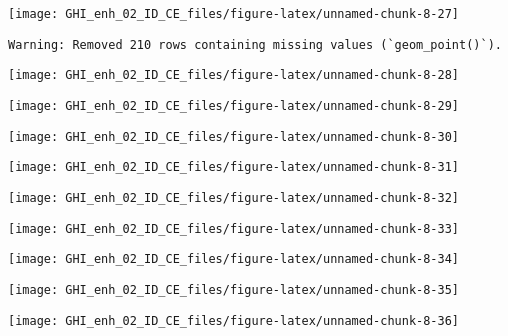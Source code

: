\documentclass[
  10pt,
  a4paper,oneside]{article}
\begin{document}
\begin{center}\texttt{[image: GHI\_enh\_02\_ID\_CE\_files/figure-latex/unnamed-chunk-8-27]} \end{center}

\begin{verbatim}
Warning: Removed 210 rows containing missing values (`geom_point()`).
\end{verbatim}

\begin{center}\texttt{[image: GHI\_enh\_02\_ID\_CE\_files/figure-latex/unnamed-chunk-8-28]} \end{center}

\begin{center}\texttt{[image: GHI\_enh\_02\_ID\_CE\_files/figure-latex/unnamed-chunk-8-29]} \end{center}

\begin{center}\texttt{[image: GHI\_enh\_02\_ID\_CE\_files/figure-latex/unnamed-chunk-8-30]} \end{center}

\begin{center}\texttt{[image: GHI\_enh\_02\_ID\_CE\_files/figure-latex/unnamed-chunk-8-31]} \end{center}

\begin{center}\texttt{[image: GHI\_enh\_02\_ID\_CE\_files/figure-latex/unnamed-chunk-8-32]} \end{center}

\begin{center}\texttt{[image: GHI\_enh\_02\_ID\_CE\_files/figure-latex/unnamed-chunk-8-33]} \end{center}

\begin{center}\texttt{[image: GHI\_enh\_02\_ID\_CE\_files/figure-latex/unnamed-chunk-8-34]} \end{center}

\begin{center}\texttt{[image: GHI\_enh\_02\_ID\_CE\_files/figure-latex/unnamed-chunk-8-35]} \end{center}

\begin{center}\texttt{[image: GHI\_enh\_02\_ID\_CE\_files/figure-latex/unnamed-chunk-8-36]} \end{center}
\end{document}
